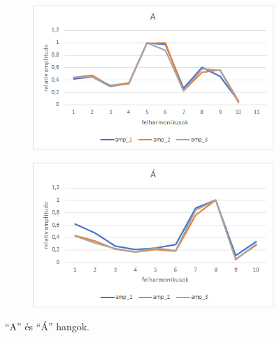 \documentclass[a4paper,12pt]{article}
\begin{document}
\begin{figure}[h!]
\begin{subfigure}[t]{.5\linewidth}
\centering
\includegraphics[width = \linewidth]{A.png}
\end{subfigure}%
\begin{subfigure}[t]{.5\linewidth}
\centering
\includegraphics[width = \linewidth]{A_1.png}
\end{subfigure}
\caption{``A'' és ``Á'' hangok.}
\label{a_a}
\end{figure}
\end{document}
